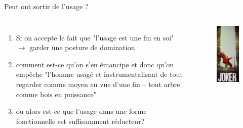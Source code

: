 \documentclass[newPxFont]{beamer}
\begin{document}
\begin{frame}[c]{Peut ont sortir de l'usage ? }
  \vspace{-1cm}
  \begin{columns}[onlytextwidth,T]
    \column{\dimexpr\linewidth-30mm-5mm}
    \begin{enumerate}
        \item Si on accepte le fait que "l'usage est une fin en soi" $\rightarrow$ garder une posture de domination
        \item comment est-ce qu'on s'en émancipe et donc qu'on empêche "l'homme usagé et instrumentalisant de tout regarder comme moyen en vue d'une fin – tout arbre comme bois en puissance"
        \item ou alors est-ce que l'usage dans une forme fonctionnelle est suffisamment réducteur? 
    \end{enumerate}
    
    \column{30mm}
    \begin{figure}
      \includegraphics[width=3.9cm]{img/joker.jpg}
    \end{figure}
  \end{columns}
\end{frame}
\end{document}
